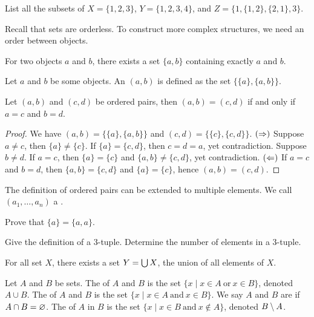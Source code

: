 \documentclass[10pt]{article}
\begin{document}
\begin{problem}
    List all the subsets of $X=\{1,2,3\}$, $Y=\{1,2,3,4\}$, and $Z=\{1,\{1,2\},\{2,1\},3\}$.
\end{problem}
Recall that sets are orderless. To construct more complex structures, we need an order between objects. 
\begin{Axiom of pairing}
    For two objects $a$ and $b$, there exists a set $\{a,b\}$ containing exactly $a$ and $b$.
\end{Axiom of pairing}
\begin{definition}
    Let $a$ and $b$ be some objects. An  $(a,b)$ is defined as the set $\{\{a\},\{a,b\}\}$.
\end{definition}
\begin{proposition}
    Let $(a,b)$ and $(c,d)$ be ordered pairs, then $(a,b)=(c,d)$ if and only if $a=c$ and $b=d$.
\end{proposition}
\begin{proof}
    We have $(a,b)=\{\{a\},\{a,b\}\}$ and $(c,d)=\{\{c\},\{c,d\}\}$. $(\Rightarrow)$ Suppose $a\ne c$, then $\{a\}\ne\{c\}$. If $\{a\}=\{c,d\}$, then $c=d=a$, yet contradiction. Suppose $b\ne d$. If $a=c$, then $\{a\}=\{c\}$ and $\{a,b\}\ne\{c,d\}$, yet contradiction. $(\Leftarrow)$ If $a=c$ and $b=d$, then $\{a,b\}=\{c,d\}$ and $\{a\}=\{c\}$, hence $(a,b)=(c,d)$.
\end{proof}
\par
The definition of ordered pairs can be extended to multiple elements. We call $({a}_{1},\dots,{a}_{n})$ a .
\begin{problem}
    Prove that $\{a\}=\{a,a\}$.
\end{problem}
\begin{problem}
    Give the definition of a 3-tuple. Determine the number of elements in a 3-tuple.
\end{problem}
\begin{Axiom of union}
    For all set $X$, there exists a set $Y=\bigcup X$, the union of all elements of $X$.
\end{Axiom of union}
\begin{definition}
    Let $A$ and $B$ be sets. The  of $A$ and $B$ is the set $\{x\mid x\in A\ \text{or}\ x\in B\}$, denoted $A\cup B$. The  of $A$ and $B$ is the set $\{x\mid x\in A\ \text{and}\ x\in B\}$. We say $A$ and $B$ are  if $A\cap B=\varnothing$. The  of $A$ in $B$ is the set $\{x\mid x\in B\ \text{and}\ x\notin A\}$, denoted $B\setminus A$.
\end{definition}
\end{document}
